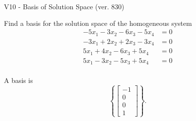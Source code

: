 \begin{exercise}
  \begin{exerciseTitle}V10 - Basis of Solution Space (ver. 830)\end{exerciseTitle}
  \begin{exerciseStatement}
    Find a basis for the solution space of the homogeneous system 
\begin{align*}
 -5 x_ 1 -3 x_ 2 -6 x_ 3 -5 x_ 4 &= 0  \\ 
  -3 x_ 1 + 2 x_ 2 + 2 x_ 3 -3 x_ 4 &= 0  \\ 
  5 x_ 1 + 4 x_ 2 -6 x_ 3 + 5 x_ 4 &= 0  \\ 
  5 x_ 1 -3 x_ 2 -5 x_ 3 + 5 x_ 4 &= 0  \\ 
 \end{align*}


 
  \end{exerciseStatement}

  \begin{exerciseAnswer}
   A basis is   
\[\left\{\left[\begin{array}{c}
-1 \\
0 \\
0 \\
1
\end{array}\right]\right\}.\]

  


  \end{exerciseAnswer}
\end{exercise}